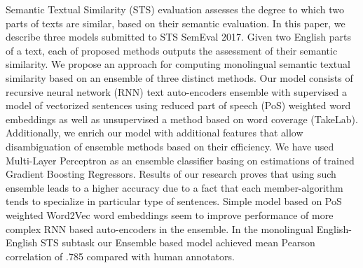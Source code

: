 Semantic Textual Similarity (STS) evaluation assesses the degree to which two parts of texts are similar, based on their semantic evaluation. In this paper, we describe three models submitted to STS SemEval 2017. Given two English parts of a text, each of proposed methods outputs the assessment of their semantic similarity. We propose an approach for computing monolingual semantic textual similarity based on an ensemble of three distinct methods. Our model consists of recursive neural network (RNN) text auto-encoders ensemble with supervised a model of vectorized sentences using reduced part of speech (PoS) weighted word embeddings as well as unsupervised a method based on word coverage (TakeLab). Additionally, we enrich our model with additional features that allow disambiguation of ensemble methods based on their efficiency. We have used Multi-Layer Perceptron as an ensemble classifier basing on estimations of trained Gradient Boosting Regressors. Results of our research proves that using such ensemble leads to a higher accuracy due to a fact that each member-algorithm tends to specialize in particular type of sentences. Simple model based on PoS weighted Word2Vec word embeddings seem to improve performance of more complex RNN based auto-encoders in the ensemble. In the monolingual English-English STS subtask our Ensemble based model achieved mean Pearson correlation of .785 compared with human annotators.
